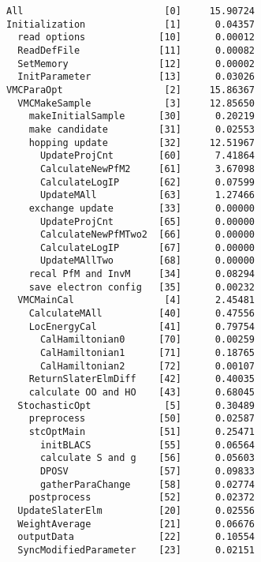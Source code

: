 \begin{minipage}{15.5cm}
\begin{screen}
\begin{verbatim}
All                         [0]     15.90724
Initialization              [1]      0.04357
  read options             [10]      0.00012
  ReadDefFile              [11]      0.00082
  SetMemory                [12]      0.00002
  InitParameter            [13]      0.03026
VMCParaOpt                  [2]     15.86367
  VMCMakeSample             [3]     12.85650
    makeInitialSample      [30]      0.20219
    make candidate         [31]      0.02553
    hopping update         [32]     12.51967
      UpdateProjCnt        [60]      7.41864
      CalculateNewPfM2     [61]      3.67098
      CalculateLogIP       [62]      0.07599
      UpdateMAll           [63]      1.27466
    exchange update        [33]      0.00000
      UpdateProjCnt        [65]      0.00000
      CalculateNewPfMTwo2  [66]      0.00000
      CalculateLogIP       [67]      0.00000
      UpdateMAllTwo        [68]      0.00000
    recal PfM and InvM     [34]      0.08294
    save electron config   [35]      0.00232
  VMCMainCal                [4]      2.45481
    CalculateMAll          [40]      0.47556
    LocEnergyCal           [41]      0.79754
      CalHamiltonian0      [70]      0.00259
      CalHamiltonian1      [71]      0.18765
      CalHamiltonian2      [72]      0.00107
    ReturnSlaterElmDiff    [42]      0.40035
    calculate OO and HO    [43]      0.68045
  StochasticOpt             [5]      0.30489
    preprocess             [50]      0.02587
    stcOptMain             [51]      0.25471
      initBLACS            [55]      0.06564
      calculate S and g    [56]      0.05603
      DPOSV                [57]      0.09833
      gatherParaChange     [58]      0.02774
    postprocess            [52]      0.02372
  UpdateSlaterElm          [20]      0.02556
  WeightAverage            [21]      0.06676
  outputData               [22]      0.10554
  SyncModifiedParameter    [23]      0.02151\end{verbatim}
\end{screen}
\end{minipage}


\newpage
